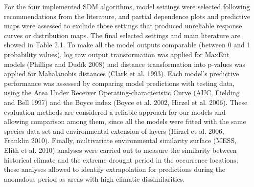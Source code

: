 \documentclass[11pt,twoside]{reedthesis}
\begin{document}
For the four implemented SDM algorithms, model settings were selected
following recommendations from the literature, and partial dependence
plots and predictive maps were assessed to exclude those settings that
produced unreliable response curves or distribution maps. The final
selected settings and main literature are showed in Table 2.1. To make
all the model outputs comparable (between 0 and 1 probability values),
log raw output transformation was applied for MaxEnt models (Phillips
and Dudík 2008) and distance transformation into p-values was applied
for Mahalanobis distances (Clark et al. 1993). Each model's predictive
performance was assessed by comparing model predictions with testing
data, using the Area Under Receiver Operating-characteristic Curve (AUC,
Fielding and Bell 1997) and the Boyce index (Boyce et al. 2002, Hirzel
et al. 2006). These evaluation methods are considered a reliable
approach for our models and allowing comparison among them, since all
the models were fitted with the same species data set and environmental
extension of layers (Hirzel et al. 2006, Franklin 2010). Finally,
multivariate environmental similarity surface (MESS, Elith et al. 2010)
analyses were carried out to measure the similarity between historical
climate and the extreme drought period in the occurrence locations;
these analyses allowed to identify extrapolation for predictions during
the anomalous period as areas with high climatic dissimilarities.\par
\end{document}
